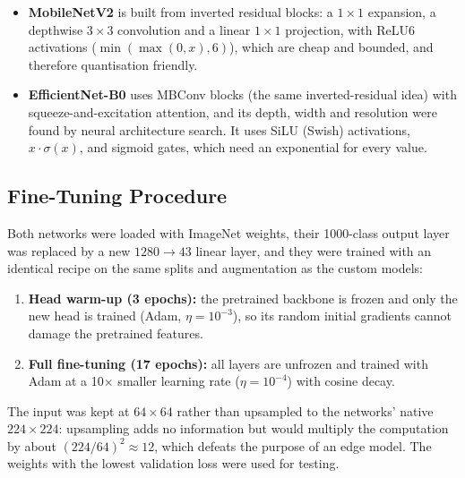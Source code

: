 \documentclass[11pt, a4paper]{article}
\begin{document}
\begin{itemize}
    \item \textbf{MobileNetV2} \cite{mobilenetv2} is built from inverted residual blocks: a $1 \times 1$ expansion,
          a depthwise $3 \times 3$ convolution and a linear $1 \times 1$ projection, with ReLU6 activations
          ($\min(\max(0, x), 6)$), which are cheap and bounded, and therefore quantisation friendly.
    \item \textbf{EfficientNet-B0} \cite{efficientnet} uses MBConv blocks (the same inverted-residual idea) with
          squeeze-and-excitation attention, and its depth, width and resolution were found by neural architecture
          search. It uses SiLU (Swish) activations, $x \cdot \sigma(x)$, and sigmoid gates, which need an exponential for
          every value.
\end{itemize}

\subsection{Fine-Tuning Procedure}

Both networks were loaded with ImageNet weights, their 1000-class output layer was replaced by a new
$1280 \rightarrow 43$ linear layer, and they were trained with an identical recipe on the same splits and
augmentation as the custom models:
\begin{enumerate}
    \item \textbf{Head warm-up (3 epochs):} the pretrained backbone is frozen and only the new head is trained (Adam,
          $\eta = 10^{-3}$), so its random initial gradients cannot damage the pretrained features.
    \item \textbf{Full fine-tuning (17 epochs):} all layers are unfrozen and trained with Adam at a 10$\times$ smaller
          learning rate ($\eta = 10^{-4}$) with cosine decay.
\end{enumerate}
The input was kept at $64 \times 64$ rather than upsampled to the networks' native $224 \times 224$: upsampling adds
no information but would multiply the computation by about $(224/64)^2 \approx 12$, which defeats the purpose of an
edge model. The weights with the lowest validation loss were used for testing.
\end{document}
